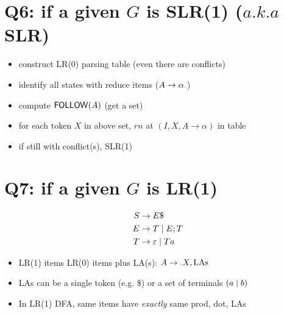 \documentclass[10pt,a4paper,landscape]{article}
\begin{document}
\begin{multicols*}{3}
\section*{Q6: if a given $G$ is SLR(1) ($a.k.a$ SLR)}
\begin{itemize}
\item construct LR(0) parsing table (even there are conflicts)
\item identify all states with reduce items ($A\to\alpha \lrd$)
\item compute $\mfn{follow}(A)$ (get a set)
\item for each token $X$ in above set, $rn$ at $(I,X, A\to\alpha)$ in table
\item if still with conflict(s),  SLR(1)
\end{itemize}
\section*{Q7: if a given $G$ is LR(1)}
\begin{minipage}{.5\linewidth}
\begin{align*}
  S&\to E\$ \\
  E&\to T \;|\; E;T \\
  T&\to \varepsilon \;|\; Ta
\end{align*}
\end{minipage}
\begin{minipage}{.5\linewidth}
  \centering
\end{minipage}
\begin{itemize}
\item LR(1) items LR(0) items plus LA(s): $A\to \lrd X, \text{LAs}$
\item LAs can be a single token (e.g. $\$$) or a set of terminals $(a\;|\; b)$
\item In LR(1) DFA, same items have \emph{exactly} same prod, dot, LAs

\end{itemize}
\end{multicols*}
\end{document}
